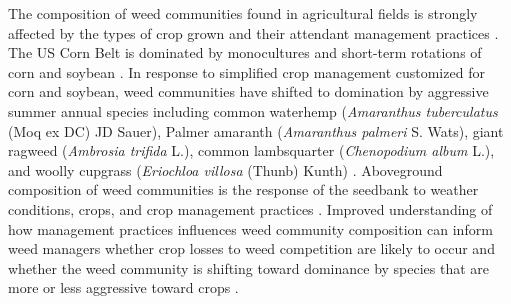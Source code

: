 \documentclass[
]{article}
\begin{document}
The composition of weed communities found in agricultural fields is strongly affected by the types of crop grown and their attendant management practices \citep{mohlerWeedEvolutionCommunity2001}. The US Corn Belt is dominated by monocultures and short-term rotations of corn and soybean \citep{centerforspatialinformationscienceandsystemsCropScapeCroplandData2021}. In response to simplified crop management customized for corn and soybean, weed communities have shifted to domination by aggressive summer annual species including common waterhemp (\emph{Amaranthus tuberculatus} (Moq ex DC) JD Sauer), Palmer amaranth (\emph{Amaranthus palmeri} S. Wats), giant ragweed (\emph{Ambrosia triﬁda} L.), common lambsquarter (\emph{Chenopodium album} L.), and woolly cupgrass (\emph{Eriochloa villosa} (Thunb) Kunth) \citep{owenWeedSpeciesShifts2008, krugerGrowerViewsProblematic2009, reddyGlyphosateresistantCropProduction2010}. Aboveground composition of weed communities is the response of the seedbank to weather conditions, crops, and crop management practices \citep{legereDiversityAssemblyWeed2005, culpepperGlyphosateinducedWeedShifts2006, smithAssemblyWeedCommunities2007}. Improved understanding of how management practices influences weed community composition can inform weed managers whether crop losses to weed competition are likely to occur and whether the weed community is shifting toward dominance by species that are more or less aggressive toward crops \citep{liebmanWeedManagementNeed2001}.
\end{document}
